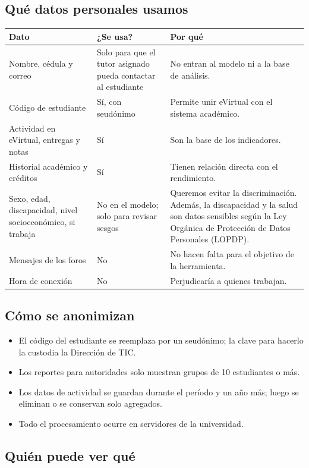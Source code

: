 \documentclass[10pt]{article}
\begin{document}
\subsection{Qué datos personales usamos}

{\small
\begin{longtable}{P{7.2cm} P{6.5cm} P{10.5cm}}
\toprule
\textbf{Dato} & \textbf{¿Se usa?} & \textbf{Por qué}\\
\midrule
\endhead
\bottomrule
\endfoot
Nombre, cédula y correo & Solo para que el tutor asignado pueda contactar al estudiante & No entran al modelo ni a la base de análisis.\\
Código de estudiante & Sí, con seudónimo & Permite unir eVirtual con el sistema académico.\\
Actividad en eVirtual, entregas y notas & Sí & Son la base de los indicadores.\\
Historial académico y créditos & Sí & Tienen relación directa con el rendimiento.\\
Sexo, edad, discapacidad, nivel socioeconómico, si trabaja & No en el modelo; solo para revisar sesgos & Queremos evitar la discriminación. Además, la discapacidad y la salud son datos sensibles según la Ley Orgánica de Protección de Datos Personales (LOPDP).\\
Mensajes de los foros & No & No hacen falta para el objetivo de la herramienta.\\
Hora de conexión & No & Perjudicaría a quienes trabajan.\\
\end{longtable}
}

\subsection{Cómo se anonimizan}
\begin{itemize}
\item El código del estudiante se reemplaza por un seudónimo; la clave para hacerlo la custodia la Dirección de TIC.
\item Los reportes para autoridades solo muestran grupos de 10 estudiantes o más.
\item Los datos de actividad se guardan durante el período y un año más; luego se eliminan o se conservan solo agregados.
\item Todo el procesamiento ocurre en servidores de la universidad.
\end{itemize}

\subsection{Quién puede ver qué}
\end{document}
